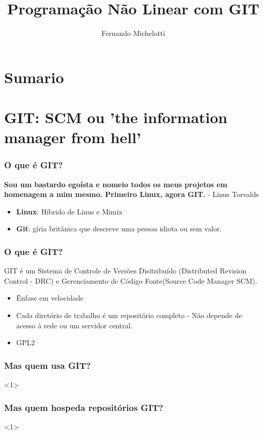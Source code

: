 \documentclass{beamer}
\author{Fernando Michelotti}
\title{Programação Não Linear com GIT}
\begin{document}
\frame{\titlepage}
\section{Sumario}

\frame{\tableofcontents}

\section{GIT: SCM ou 'the information manager from hell'}

\begin{frame}
\frametitle{O que é GIT?}

\textbf{Sou um bastardo egoísta e nomeio todos os meus projetos em homenagem a mim mesmo. Primeiro Linux, agora GIT.}
- Linus Torvalds

\begin{itemize}
\item \textbf{Linux}: Híbrido de Linus e Mimix
\item \textbf{Git}: gíria britânica que descreve uma pessoa idiota ou sem valor.
\end{itemize}

\end{frame}

\begin{frame}
\frametitle{O que é GIT?}

GIT é um Sistema de Controle de Versões Disitribuído (Distributed Revision Control - DRC) e Gerenciamento de Código Fonte(Source Code Manager SCM).
\begin{itemize}
\item Ênfase em velocidade
\item Cada diretório de trabalho é um repositório completo - Não depende de acesso à rede ou um servidor central.
\item GPL2
\end{itemize}

\end{frame}


\begin{frame}
\frametitle{Mas quem usa GIT?}

<1>

\end{frame}

\begin{frame}
\frametitle{Mas quem hospeda repositórios GIT?}

<1>

\end{frame}
\end{document}
